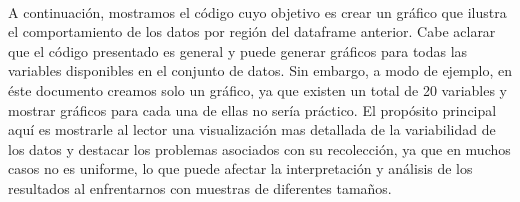 \documentclass[11pt]{article}
\begin{document}
    \begin{center}
    \end{center}
    { \hspace*{\fill} \\}
    
    A continuación, mostramos el código cuyo objetivo es crear un gráfico
que ilustra el comportamiento de los datos por región del dataframe
anterior. Cabe aclarar que el código presentado es general y puede
generar gráficos para todas las variables disponibles en el conjunto de
datos. Sin embargo, a modo de ejemplo, en éste documento creamos solo un
gráfico, ya que existen un total de 20 variables y mostrar gráficos para
cada una de ellas no sería práctico. El propósito principal aquí es
mostrarle al lector una visualización mas detallada de la variabilidad
de los datos y destacar los problemas asociados con su recolección, ya
que en muchos casos no es uniforme, lo que puede afectar la
interpretación y análisis de los resultados al enfrentarnos con muestras
de diferentes tamaños.
\end{document}
